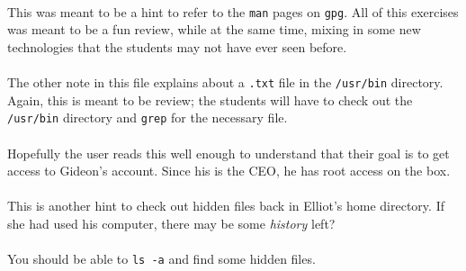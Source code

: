 \documentclass[11pt]{article}
\begin{document}
	\paragraph{} This was meant to be a hint to refer to the \texttt{man} pages on \texttt{gpg}. All of this exercises was meant to be a fun review, while at the same time, mixing in some new technologies that the students may not have ever seen before. 

	\paragraph{} The other note in this file explains about a \texttt{.txt} file in the \texttt{/usr/bin} directory. Again, this is meant to be review; the students will have to check out the \texttt{/usr/bin} directory and \texttt{grep} for the necessary file. \\

		\begin{center}
		\graphicspath{ {.} }
		\centering
	\end{center}		

	\newpage

	\paragraph{} Hopefully the user reads this well enough to understand that their goal is to get access to Gideon's account. Since his is the CEO, he has root access on the box.

	\paragraph{} This is another hint to check out hidden files back in Elliot's home directory. If she had used his computer, there may be some \textit{history} left?

	\paragraph{} You should be able to \texttt{ls -a} and find some hidden files.
\end{document}
